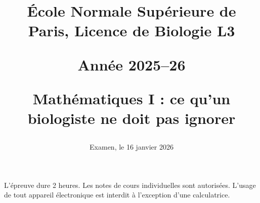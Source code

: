 \documentclass[french, 11pt]{article}
\title{\normalsize{\sc École Normale Supérieure de Paris, Licence de Biologie L3}
  
  \bigskip
  \normalsize{\sc Année 2025–26}
  
  \bigskip
  \large{\bf Mathématiques I : ce qu’un biologiste ne doit pas ignorer} 
  
}
\date{Examen, le 16 janvier 2026}
\newcommand{\alglin}{/home/robin/ENSEIGN/Cours/MathBiologie/L3-ENS-Math1/Exercices/AlgLin}
\newcommand{\multivar}{/home/robin/ENSEIGN/Cours/MathBiologie/L3-ENS-Math1/Exercices/MultiVar}
\newcommand{\equadiff}{/home/robin/ENSEIGN/Cours/MathBiologie/L3-ENS-Math1/Exercices/EquaDiff}
\newcommand{\probas}{/home/robin/ENSEIGN/Cours/MathBiologie/L3-ENS-Math1/Exercices/Probas}
\begin{document}

\maketitle

\bigskip
L'épreuve dure 2 heures. 
Les notes de cours individuelles sont autorisées.
L’usage de tout appareil électronique est interdit à l’exception d’une calculatrice.

% 







\end{document}
